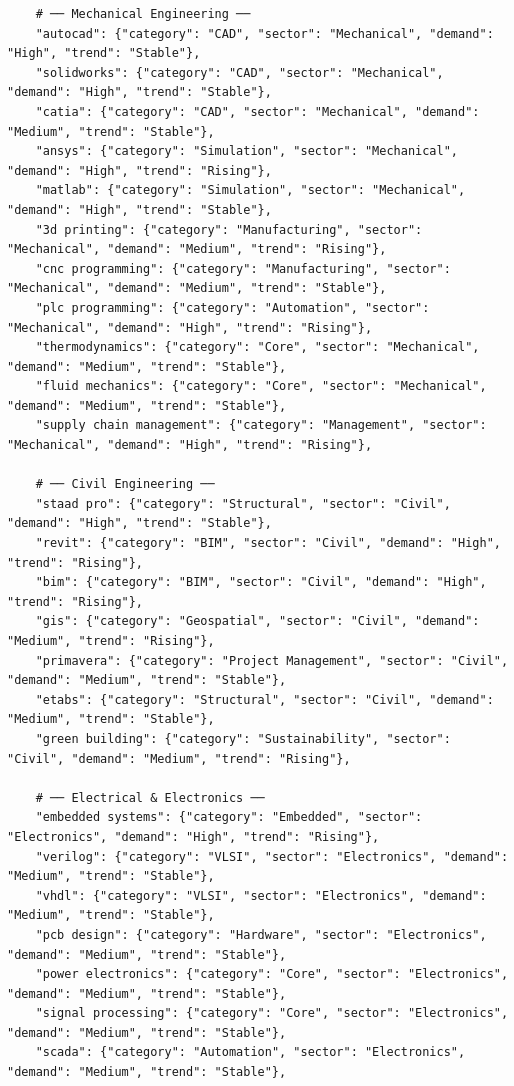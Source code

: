 \documentclass[12pt,a4paper]{report}
\begin{document}
\begin{verbatim}
    # ── Mechanical Engineering ──
    "autocad": {"category": "CAD", "sector": "Mechanical", "demand": "High", "trend": "Stable"},
    "solidworks": {"category": "CAD", "sector": "Mechanical", "demand": "High", "trend": "Stable"},
    "catia": {"category": "CAD", "sector": "Mechanical", "demand": "Medium", "trend": "Stable"},
    "ansys": {"category": "Simulation", "sector": "Mechanical", "demand": "High", "trend": "Rising"},
    "matlab": {"category": "Simulation", "sector": "Mechanical", "demand": "High", "trend": "Stable"},
    "3d printing": {"category": "Manufacturing", "sector": "Mechanical", "demand": "Medium", "trend": "Rising"},
    "cnc programming": {"category": "Manufacturing", "sector": "Mechanical", "demand": "Medium", "trend": "Stable"},
    "plc programming": {"category": "Automation", "sector": "Mechanical", "demand": "High", "trend": "Rising"},
    "thermodynamics": {"category": "Core", "sector": "Mechanical", "demand": "Medium", "trend": "Stable"},
    "fluid mechanics": {"category": "Core", "sector": "Mechanical", "demand": "Medium", "trend": "Stable"},
    "supply chain management": {"category": "Management", "sector": "Mechanical", "demand": "High", "trend": "Rising"},

    # ── Civil Engineering ──
    "staad pro": {"category": "Structural", "sector": "Civil", "demand": "High", "trend": "Stable"},
    "revit": {"category": "BIM", "sector": "Civil", "demand": "High", "trend": "Rising"},
    "bim": {"category": "BIM", "sector": "Civil", "demand": "High", "trend": "Rising"},
    "gis": {"category": "Geospatial", "sector": "Civil", "demand": "Medium", "trend": "Rising"},
    "primavera": {"category": "Project Management", "sector": "Civil", "demand": "Medium", "trend": "Stable"},
    "etabs": {"category": "Structural", "sector": "Civil", "demand": "Medium", "trend": "Stable"},
    "green building": {"category": "Sustainability", "sector": "Civil", "demand": "Medium", "trend": "Rising"},

    # ── Electrical & Electronics ──
    "embedded systems": {"category": "Embedded", "sector": "Electronics", "demand": "High", "trend": "Rising"},
    "verilog": {"category": "VLSI", "sector": "Electronics", "demand": "Medium", "trend": "Stable"},
    "vhdl": {"category": "VLSI", "sector": "Electronics", "demand": "Medium", "trend": "Stable"},
    "pcb design": {"category": "Hardware", "sector": "Electronics", "demand": "Medium", "trend": "Stable"},
    "power electronics": {"category": "Core", "sector": "Electronics", "demand": "Medium", "trend": "Stable"},
    "signal processing": {"category": "Core", "sector": "Electronics", "demand": "Medium", "trend": "Stable"},
    "scada": {"category": "Automation", "sector": "Electronics", "demand": "Medium", "trend": "Stable"},


\end{verbatim}
\end{document}
